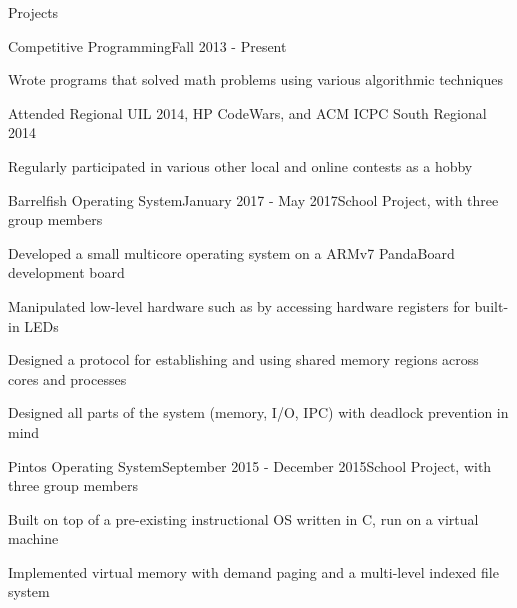 \documentclass{resume} %
\begin{document}
\begin{rSection}{Projects}

\begin{rSubsection}{Competitive Programming}{Fall 2013 - Present}{}{}
\item Wrote programs that solved math problems using various algorithmic techniques
\item Attended Regional UIL 2014, HP CodeWars, and ACM ICPC South Regional 2014
\item Regularly participated in various other local and online contests as a hobby
\end{rSubsection}

\begin{rSubsection}{Barrelfish Operating System}{January 2017 - May 2017}{School Project, with three group members}{}
    \item Developed a small multicore operating system on a ARMv7 PandaBoard development board
    \item Manipulated low-level hardware such as by accessing hardware registers for built-in LEDs
    \item Designed a protocol for establishing and using shared memory regions across cores and processes
    \item Designed all parts of the system (memory, I/O, IPC) with deadlock prevention in mind
\end{rSubsection}


\begin{rSubsection}{Pintos Operating System}{September 2015 - December 2015}{School Project, with three group members}{}
	\item Built on top of a pre-existing instructional OS written in C, run on a virtual machine
	\item Implemented virtual memory with demand paging and a multi-level indexed file system
\end{rSubsection}


\iffalse
\begin{rSubsection}{Shirt Exchange}{June - July 2016}{Personal Project}{}
\item Set up a home server on a Raspberry Pi
\item Created a simple CRUD application using Python Flask and SQLite
\end{rSubsection}

\begin{rSubsection}{Twister}{May 2014}{Android Game, group of two}{}
	\item Used Java and the Android SDK to develop a simple mobile game
\end{rSubsection}
\fi

\end{rSection}
\end{document}
